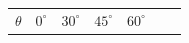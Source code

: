 {{        \begin{center}
      
      \label{m39414*id89593}
      
    \noindent
      \tablelasttail{}
      \begin{xtabular}[t]{|l|l|l|l|l|l|l|}\hline
    
    
        
                  \begin{math}\theta \end{math}
                 &
    
    
        
                  \begin{math}{0}^{\circ }\end{math}
                 &
    
    
        
                  \begin{math}{30}^{\circ }\end{math}
                 &
    
    
        
                  \begin{math}{45}^{\circ }\end{math}
                 &
    
    
        
                  \begin{math}{60}^{\circ }\end{math}
                 &
    

\end{xtabular}
\end{center}}}
